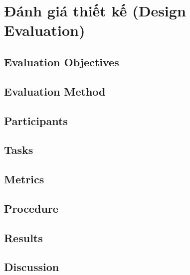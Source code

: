 \section{Đánh giá thiết kế (Design Evaluation)}

\subsection{Evaluation Objectives}

\subsection{Evaluation Method}

\subsection{Participants}

\subsection{Tasks}

\subsection{Metrics}

\subsection{Procedure}

\subsection{Results}

\subsection{Discussion}
